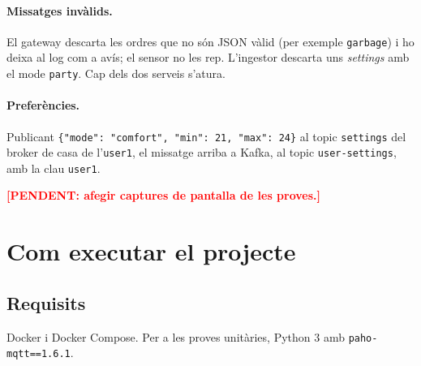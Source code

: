 \documentclass[11pt,a4paper]{article}
\newcommand{\pendent}[1]{\textcolor{red}{\textbf{[PENDENT: #1]}}}
\begin{document}
\paragraph{Missatges invàlids.}
El gateway descarta les ordres que no són JSON vàlid (per exemple
\texttt{garbage}) i ho deixa al log com a avís; el sensor no les rep.
L'ingestor descarta uns \emph{settings} amb el mode \texttt{party}. Cap dels
dos serveis s'atura.

\paragraph{Preferències.}
Publicant \texttt{\{"mode": "comfort", "min": 21, "max": 24\}} al topic
\texttt{settings} del broker de casa de l'\texttt{user1}, el missatge arriba
a Kafka, al topic \texttt{user-settings}, amb la clau \texttt{user1}.

\pendent{afegir captures de pantalla de les proves.}

\section{Com executar el projecte}

\subsection*{Requisits}
Docker i Docker Compose. Per a les proves unitàries, Python 3 amb
\texttt{paho-mqtt==1.6.1}.
\end{document}
